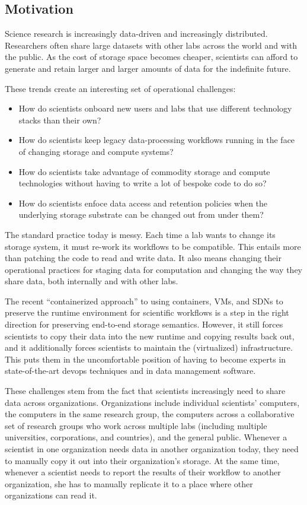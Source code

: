 \subsection{Motivation}

Science research is increasingly data-driven and increasingly distributed.
Researchers often share large datasets with other labs across the world and 
with the public.  As the cost of storage space becomes cheaper, scientists can
afford to generate and retain larger and larger amounts of data for the
indefinite future.

These trends create an interesting set of operational challenges:

\begin{itemize}
   \item How do scientists onboard new users and labs that use different
      technology stacks than their own?
   \item How do scientists keep legacy data-processing workflows running in the face
      of changing storage and compute systems?
   \item How do scientists take advantage of commodity storage and
      compute technologies without having to write a lot of bespoke code
      to do so?
   \item How do scientists enfoce data access and retention policies when the
      underlying storage substrate can be changed out from under them?
\end{itemize}

The standard practice today is messy.  Each time a lab wants to change its
storage system, it must re-work its workflows to be compatible.  This entails
more than patching the code to read and write data.  It also means changing their
operational practices for staging data for computation and changing the way they
share data, both internally and with other labs.

The recent ``containerized approach'' to using containers, VMs, and
SDNs to preserve the runtime environment for scientific workflows
is a step in the right direction for preserving end-to-end storage semantics.
However, it still forces scientists to copy their data into the new
runtime and copying results back out, and it additionally forces scientists to
maintain the (virtualized) infrastructure.  This puts them in the uncomfortable
position of having to become experts in state-of-the-art devops techniques and
in data management software.

These challenges stem from the fact that scientists increasingly need to share
data across organizations.  Organizations include individual
scientists' computers, the computers in the same research group, the computers
across a collaborative set of research groups who
work across multiple labs (including multiple universities, corporations, and
countries), and the general public.  Whenever a scientist in one organization
needs data in another organization today, they need to manually copy it out into their
organization's storage.  At the same time, whenever a scientist needs to report the results
of their workflow to another organization, she has to manually replicate it to a place
where other organizations can read it.

